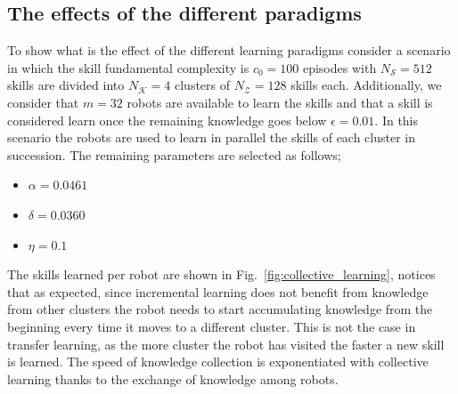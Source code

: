 \subsection{The effects of the different paradigms}
To show what is the effect of the different learning paradigms consider a scenario in which the skill fundamental complexity is $c_0=100$ episodes with $N_\mathcal{S}= 512$  skills are divided into $N_\mathcal{K}=4$ clusters of $N_\mathcal{Z} = 128$ skills each. Additionally, we consider that $m=32$ robots are available to learn the skills and that a skill is considered learn once the remaining knowledge goes below $\epsilon = 0.01$. In this scenario the robots are used to learn in parallel the skills of each cluster in succession. The remaining parameters are selected as follows;
\begin{itemize}
	\item $\alpha =  0.0461$
	\item $\delta =  0.0360$
	\item $\eta= 0.1$
\end{itemize} 
The skills learned per robot are shown in Fig.~\ref{fig:collective_learning}, notices that as expected, since incremental learning does not benefit from knowledge from other clusters the robot needs to start accumulating knowledge from the beginning every time it moves to a different cluster. This is not the case in transfer learning, as the more cluster the robot has visited the faster a new skill is learned. The speed of knowledge collection is exponentiated with collective learning thanks to the exchange of knowledge among robots. 
